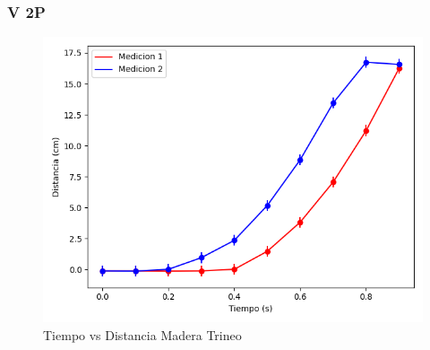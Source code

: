 \documentclass[12pt,a4]{article}
\begin{document}
\subsubsection{V 2P}

\begin{figure}[H]
    \centering
    \includegraphics[width=0.9\linewidth]{TiempoVsDistanciaPisoMaderaV_2P.png}
    \caption{Tiempo vs Distancia Madera Trineo}
    \label{fig:TvDV_2P piso trineo}
\end{figure}
\end{document}
